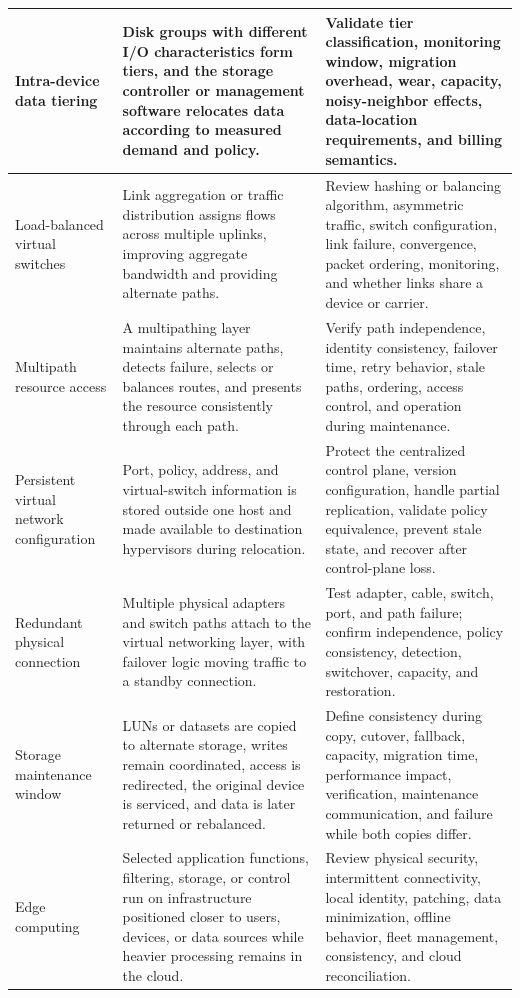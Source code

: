 \documentclass[11pt]{article}
\begin{document}
\begin{longtable}{@{}>{\RaggedRight\arraybackslash}p{}>{\RaggedRight\arraybackslash}p{}>{\RaggedRight\arraybackslash}p{}@{}}
Intra-device data tiering & Disk groups with different I/O characteristics form tiers, and the storage controller or management software relocates data according to measured demand and policy. & Validate tier classification, monitoring window, migration overhead, wear, capacity, noisy-neighbor effects, data-location requirements, and billing semantics. \\\midrule
Load-balanced virtual switches & Link aggregation or traffic distribution assigns flows across multiple uplinks, improving aggregate bandwidth and providing alternate paths. & Review hashing or balancing algorithm, asymmetric traffic, switch configuration, link failure, convergence, packet ordering, monitoring, and whether links share a device or carrier. \\\midrule
Multipath resource access & A multipathing layer maintains alternate paths, detects failure, selects or balances routes, and presents the resource consistently through each path. & Verify path independence, identity consistency, failover time, retry behavior, stale paths, ordering, access control, and operation during maintenance. \\\midrule
Persistent virtual network configuration & Port, policy, address, and virtual-switch information is stored outside one host and made available to destination hypervisors during relocation. & Protect the centralized control plane, version configuration, handle partial replication, validate policy equivalence, prevent stale state, and recover after control-plane loss. \\\midrule
Redundant physical connection & Multiple physical adapters and switch paths attach to the virtual networking layer, with failover logic moving traffic to a standby connection. & Test adapter, cable, switch, port, and path failure; confirm independence, policy consistency, detection, switchover, capacity, and restoration. \\\midrule
Storage maintenance window & LUNs or datasets are copied to alternate storage, writes remain coordinated, access is redirected, the original device is serviced, and data is later returned or rebalanced. & Define consistency during copy, cutover, fallback, capacity, migration time, performance impact, verification, maintenance communication, and failure while both copies differ. \\\midrule
Edge computing & Selected application functions, filtering, storage, or control run on infrastructure positioned closer to users, devices, or data sources while heavier processing remains in the cloud. & Review physical security, intermittent connectivity, local identity, patching, data minimization, offline behavior, fleet management, consistency, and cloud reconciliation. \\\midrule

\end{longtable}
\end{document}
